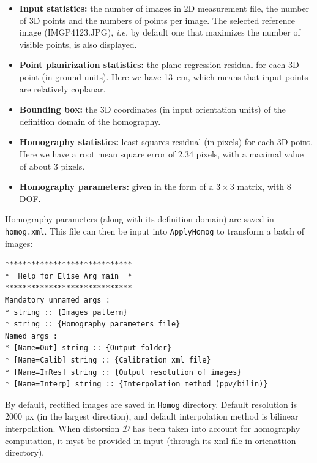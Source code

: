 \begin{itemize}
	\item \textbf{Input statistics:} the number of images in 2D measurement file, the number of 3D points and the numbers of points per image. The selected reference image (IMGP4123.JPG), \textit{i.e.} by default one that maximizes the number of visible points, is also displayed. \newline
	\item \textbf{Point planirization statistics:} the plane regression residual for each 3D point (in ground units). Here we have 13 cm, which means that input points are relatively coplanar. \newline
	\item \textbf{Bounding box:} the 3D coordinates (in input orientation units) of the definition domain of the homography. \newline
	\item \textbf{Homography statistics:} least squares residual (in pixels) for each 3D point. Here we have a root mean square error of 2.34 pixels, with a maximal value of about 3 pixels. \newline
	\item \textbf{Homography parameters:} given in the form of a $3 \times 3$ matrix, with 8 DOF. \newline
\end{itemize}

\noindent Homography parameters (along with its definition domain) are saved in \texttt{homog.xml}. This file can then be input into \texttt{ApplyHomog} to transform a batch of images: \newline

\begin{verbatim}
*****************************
*  Help for Elise Arg main  *
*****************************
Mandatory unnamed args : 
* string :: {Images pattern}
* string :: {Homography parameters file}
Named args : 
* [Name=Out] string :: {Output folder}
* [Name=Calib] string :: {Calibration xml file}
* [Name=ImRes] string :: {Output resolution of images}
* [Name=Interp] string :: {Interpolation method (ppv/bilin)}
\end{verbatim}


\noindent By default, rectified images are saved in \texttt{Homog} directory. Default resolution is 2000 px (in the largest direction), and default interpolation method is bilinear interpolation. When distorsion $\mathcal{D}$ has been taken into account for homography computation, it myst be provided in input (through its xml file in orienattion directory). \newline

